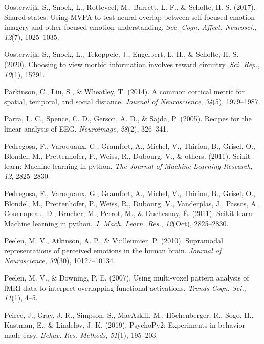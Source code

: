 \documentclass[11pt,american,]{memoir} %
\begin{document}
\leavevmode\hypertarget{ref-Oosterwijk2017-sc}{}%
Oosterwijk, S., Snoek, L., Rotteveel, M., Barrett, L. F., \& Scholte, H. S. (2017). Shared states: Using MVPA to test neural overlap between self-focused emotion imagery and other-focused emotion understanding. \emph{Soc. Cogn. Affect. Neurosci.}, \emph{12}(7), 1025--1035.

\leavevmode\hypertarget{ref-Oosterwijk2020-uf}{}%
Oosterwijk, S., Snoek, L., Tekoppele, J., Engelbert, L. H., \& Scholte, H. S. (2020). Choosing to view morbid information involves reward circuitry. \emph{Sci. Rep.}, \emph{10}(1), 15291.

\leavevmode\hypertarget{ref-parkinson2014common}{}%
Parkinson, C., Liu, S., \& Wheatley, T. (2014). A common cortical metric for spatial, temporal, and social distance. \emph{Journal of Neuroscience}, \emph{34}(5), 1979--1987.

\leavevmode\hypertarget{ref-Parra2005-um}{}%
Parra, L. C., Spence, C. D., Gerson, A. D., \& Sajda, P. (2005). Recipes for the linear analysis of EEG. \emph{Neuroimage}, \emph{28}(2), 326--341.

\leavevmode\hypertarget{ref-pedregosa2011scikit}{}%
Pedregosa, F., Varoquaux, G., Gramfort, A., Michel, V., Thirion, B., Grisel, O., Blondel, M., Prettenhofer, P., Weiss, R., Dubourg, V., \& others. (2011). Scikit-learn: Machine learning in python. \emph{The Journal of Machine Learning Research}, \emph{12}, 2825--2830.

\leavevmode\hypertarget{ref-Pedregosa2011-bp}{}%
Pedregosa, F., Varoquaux, G., Gramfort, A., Michel, V., Thirion, B., Grisel, O., Blondel, M., Prettenhofer, P., Weiss, R., Dubourg, V., Vanderplas, J., Passos, A., Cournapeau, D., Brucher, M., Perrot, M., \& Duchesnay, É. (2011). Scikit-learn: Machine learning in python. \emph{J. Mach. Learn. Res.}, \emph{12}(Oct), 2825--2830.

\leavevmode\hypertarget{ref-peelen2010supramodal}{}%
Peelen, M. V., Atkinson, A. P., \& Vuilleumier, P. (2010). Supramodal representations of perceived emotions in the human brain. \emph{Journal of Neuroscience}, \emph{30}(30), 10127--10134.

\leavevmode\hypertarget{ref-Peelen2007-ew}{}%
Peelen, M. V., \& Downing, P. E. (2007). Using multi-voxel pattern analysis of fMRI data to interpret overlapping functional activations. \emph{Trends Cogn. Sci.}, \emph{11}(1), 4--5.

\leavevmode\hypertarget{ref-Peirce2019-rj}{}%
Peirce, J., Gray, J. R., Simpson, S., MacAskill, M., Höchenberger, R., Sogo, H., Kastman, E., \& Lindeløv, J. K. (2019). PsychoPy2: Experiments in behavior made easy. \emph{Behav. Res. Methods}, \emph{51}(1), 195--203.
\end{document}
